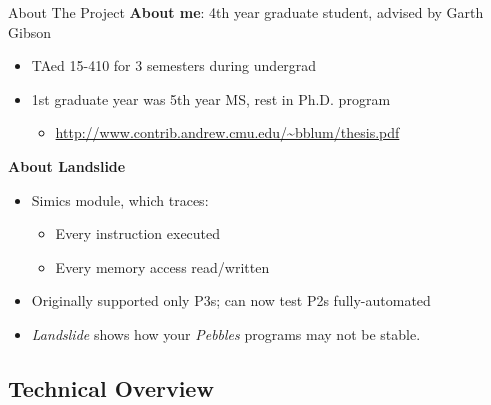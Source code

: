 \documentclass[xcolor=dvipsnames]{beamer}
\begin{document}
\begin{frame}{About The Project}
	\textbf{About me}: 4th year graduate student, advised by Garth Gibson
	\begin{itemize}
		\item TAed 15-410 for 3 semesters during undergrad
		\item 1st graduate year was 5th year MS, rest in Ph.D. program
		\begin{itemize}
			\item \url{http://www.contrib.andrew.cmu.edu/~bblum/thesis.pdf}
		\end{itemize}
	\end{itemize}
	\pause
	\linegap

	{\bf About Landslide}
	\begin{itemize}
		\item Simics module, which traces:
			\begin{itemize}
				\item Every instruction executed
				\item Every memory access read/written
			\end{itemize}
		\item Originally supported only P3s; can now test P2s fully-automated
		\item {\em Landslide} shows how your {\em Pebbles} programs may not be stable.
	\end{itemize}
\end{frame}


\subsection{Technical Overview}
\end{document}
